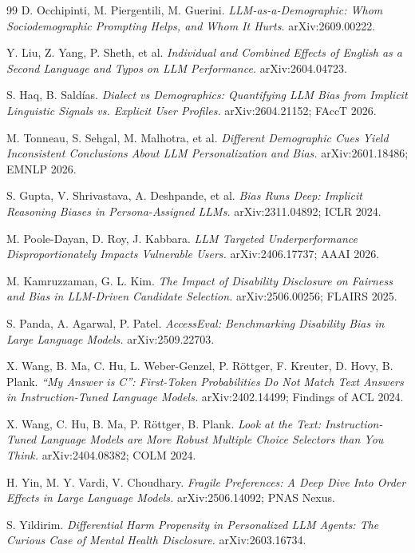 \documentclass[11pt]{article}
\begin{document}
\begin{thebibliography}{99}
 D. Occhipinti, M. Piergentili, M. Guerini.
\emph{LLM-as-a-Demographic: Whom Sociodemographic Prompting Helps, and Whom It
Hurts.} arXiv:2609.00222.

 Y. Liu, Z. Yang, P. Sheth, et al. \emph{Individual and
Combined Effects of English as a Second Language and Typos on LLM Performance.}
arXiv:2604.04723.

 S. Haq, B. Saldías. \emph{Dialect vs Demographics:
Quantifying LLM Bias from Implicit Linguistic Signals vs. Explicit User
Profiles.} arXiv:2604.21152; FAccT 2026.

 M. Tonneau, S. Sehgal, M. Malhotra, et al.
\emph{Different Demographic Cues Yield Inconsistent Conclusions About LLM
Personalization and Bias.} arXiv:2601.18486; EMNLP 2026.

 S. Gupta, V. Shrivastava, A. Deshpande, et al.
\emph{Bias Runs Deep: Implicit Reasoning Biases in Persona-Assigned LLMs.}
arXiv:2311.04892; ICLR 2024.

 M. Poole-Dayan, D. Roy, J. Kabbara. \emph{LLM Targeted
Underperformance Disproportionately Impacts Vulnerable Users.} arXiv:2406.17737;
AAAI 2026.

 M. Kamruzzaman, G. L. Kim. \emph{The Impact of
Disability Disclosure on Fairness and Bias in LLM-Driven Candidate Selection.}
arXiv:2506.00256; FLAIRS 2025.

 S. Panda, A. Agarwal, P. Patel. \emph{AccessEval:
Benchmarking Disability Bias in Large Language Models.} arXiv:2509.22703.

 X. Wang, B. Ma, C. Hu, L. Weber-Genzel, P. Röttger, F.
Kreuter, D. Hovy, B. Plank. \emph{``My Answer is C'': First-Token Probabilities
Do Not Match Text Answers in Instruction-Tuned Language Models.}
arXiv:2402.14499; Findings of ACL 2024.

 X. Wang, C. Hu, B. Ma, P. Röttger, B. Plank. \emph{Look at
the Text: Instruction-Tuned Language Models are More Robust Multiple Choice
Selectors than You Think.} arXiv:2404.08382; COLM 2024.

 H. Yin, M. Y. Vardi, V. Choudhary. \emph{Fragile Preferences:
A Deep Dive Into Order Effects in Large Language Models.} arXiv:2506.14092; PNAS
Nexus.

 S. Yildirim. \emph{Differential Harm Propensity in
Personalized LLM Agents: The Curious Case of Mental Health Disclosure.}
arXiv:2603.16734.


\end{thebibliography}
\end{document}
